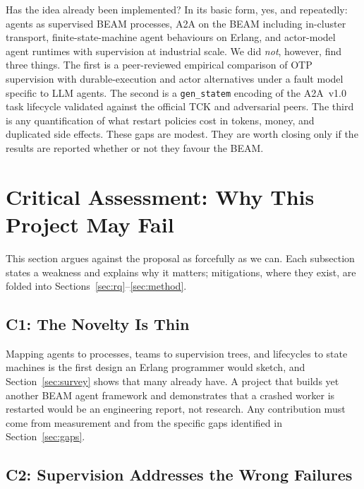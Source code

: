 \documentclass[conference,letterpaper]{IEEEtran}
\newcommand{\code}[1]{\texttt{#1}}
\newcommand{\gsm}{\code{gen\_statem}}
\begin{document}
Has the idea already been implemented? In its basic form, yes, and
repeatedly: agents as supervised BEAM processes, A2A on the BEAM including
in-cluster transport, finite-state-machine agent behaviours on Erlang, and
actor-model agent runtimes with supervision at industrial scale. We did
\emph{not}, however, find three things. The first is a peer-reviewed empirical
comparison of OTP supervision with durable-execution and actor alternatives
under a fault model specific to LLM agents. The second is a \gsm{} encoding
of the A2A~v1.0 task lifecycle validated against the official TCK and
adversarial peers. The third is any quantification of what restart policies
cost in tokens, money, and duplicated side effects. These gaps are modest.
They are worth closing only if the results are reported whether or not they
favour the BEAM.

\section{Critical Assessment: Why This Project May Fail}\label{sec:critique}

This section argues against the proposal as forcefully as we can. Each
subsection states a weakness and explains why it matters; mitigations, where
they exist, are folded into Sections~\ref{sec:rq}--\ref{sec:method}.

\subsection{C1: The Novelty Is Thin}

Mapping agents to processes, teams to supervision trees, and lifecycles to
state machines is the first design an Erlang programmer would sketch, and
Section~\ref{sec:survey} shows that many already have. A project that builds
yet another BEAM agent framework and demonstrates that a crashed worker is
restarted would be an engineering report, not research. Any contribution
must come from measurement and from the specific gaps identified in
Section~\ref{sec:gaps}.

\subsection{C2: Supervision Addresses the Wrong Failures}
\end{document}
